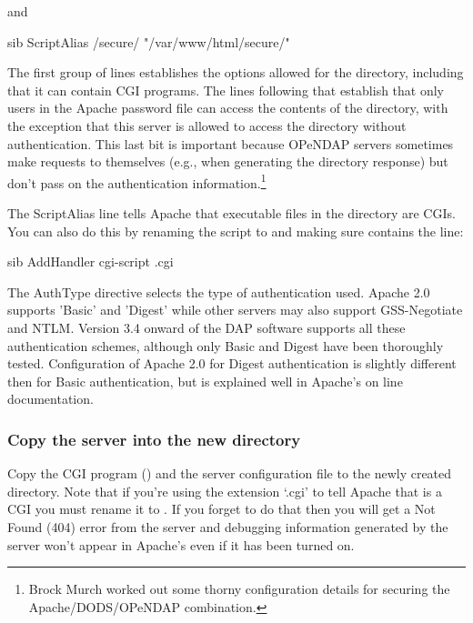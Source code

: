 \documentclass{dods-book}
\begin{document}
and

\begin{vcode}{sib}
    ScriptAlias /secure/ "/var/www/html/secure/"
\end{vcode}

The first group of lines establishes the options allowed for the
 directory, including that it can contain CGI programs.
The lines following that establish that only users in the Apache
password file can access the contents of the directory, with the
exception that this server is allowed to access the directory without
authentication. This last bit is important because OPeNDAP servers
sometimes make requests to themselves (e.g., when generating the
directory response) but don't pass on the authentication
information.\footnote{Brock Murch  worked
  out some thorny configuration details for securing the
  Apache/DODS/OPeNDAP combination.}

The ScriptAlias line tells Apache that executable files in the
directory are CGIs. You can also do this by renaming the
 script to  and making sure
 contains the line:

\begin{vcode}{sib}
    AddHandler cgi-script .cgi
\end{vcode}

The AuthType directive selects the type of authentication used. Apache 2.0
supports 'Basic' and 'Digest' while other servers may also support
GSS-Negotiate and NTLM. Version 3.4 onward of the DAP software supports all
these authentication schemes, although only Basic and Digest have been
thoroughly tested. Configuration of Apache 2.0 for Digest authentication is
slightly different then for Basic authentication, but is explained well in
Apache's on line documentation.

\subsubsection{Copy the server into the new directory}

Copy the CGI program () and the server configuration
file to the newly created directory. Note that if you're using the
extension `.cgi' to tell Apache that  is a CGI you must
rename it to . If you forget to do that then you
will get a Not Found (404) error from the server and debugging
information generated by the server won't appear in Apache's
 even if it has been turned on.
\end{document}
